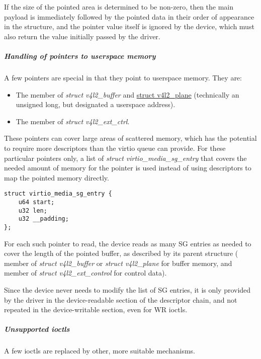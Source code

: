 If the size of the pointed area is determined to be non-zero, then the main
payload is immediately followed by the pointed data in their order of
appearance in the structure, and the pointer value itself is ignored by the
device, which must also return the value initially passed by the driver.

\subparagraph{Handling of pointers to userspace memory}

A few pointers are special in that they point to userspace memory. They are:

\begin{itemize}
\item The  member of \textit{struct v4l2_buffer} and
\href{https://www.kernel.org/doc/html/latest/userspace-api/media/v4l/buffer.html#struct-v4l2-plane}{struct v4l2_plane}
(technically an unsigned long, but designated a userspace address).
\item The  member of \textit{struct v4l2_ext_ctrl}.
\end{itemize}

These pointers can cover large areas of scattered memory, which has the
potential to require more descriptors than the virtio queue can provide. For
these particular pointers only, a list of \textit{struct virtio_media_sg_entry}
that covers the needed amount of memory for the pointer is used instead of
using descriptors to map the pointed memory directly.

\begin{lstlisting}
struct virtio_media_sg_entry {
	u64 start;
	u32 len;
	u32 __padding;
};
\end{lstlisting}

For each such pointer to read, the device reads as many SG entries as needed
to cover the length of the pointed buffer, as described by its parent
structure ( member of \textit{struct v4l2_buffer} or
\textit{struct v4l2_plane} for buffer memory, and  member of
\textit{struct v4l2_ext_control} for control data).

Since the device never needs to modify the list of SG entries, it is only
provided by the driver in the device-readable section of the descriptor chain,
and not repeated in the device-writable section, even for WR ioctls.

\subparagraph{Unsupported ioctls}

A few ioctls are replaced by other, more suitable mechanisms.

